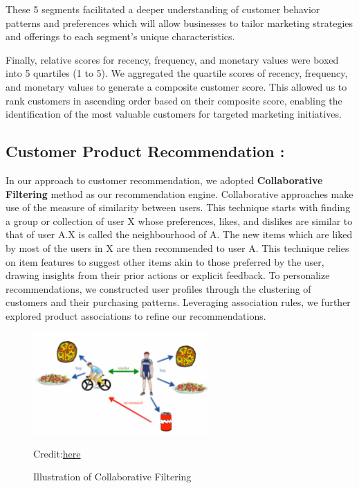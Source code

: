 \documentclass[11pt]{article} %
\begin{document}
These 5 segments facilitated a deeper understanding of customer behavior patterns and preferences which will allow businesses to tailor marketing strategies and offerings to each segment's unique characteristics. 

Finally, relative scores for recency, frequency, and monetary values were boxed into 5 quartiles (1 to 5). We aggregated the quartile scores of recency, frequency, and monetary values to generate a composite customer score. This allowed us to rank customers in ascending order based on their composite score, enabling the identification of the most valuable customers for targeted marketing initiatives.

\subsection*{Customer Product Recommendation :}
In our approach to customer recommendation, we adopted \textbf{Collaborative Filtering} method as our recommendation engine. Collaborative approaches make use of the measure of similarity between users. This technique starts with finding a group or collection of user X whose preferences, likes, and dislikes are similar to that of user A.X is called the neighbourhood of A. The new items which are liked by most of the users in X are then recommended to user A\cite{11}. This technique relies on item features to suggest other items akin to those preferred by the user, drawing insights from their prior actions or explicit feedback. To personalize recommendations, we constructed user profiles through the clustering of customers and their purchasing patterns. Leveraging association rules, we further explored product associations to refine our recommendations. 
\begin{figure}[H]
    \centering
    \includegraphics[width=0.6\textwidth]{images/collaborative_filtering.PNG}
    \caption{Illustration of Collaborative Filtering}Credit:\href{https://towardsdatascience.com/various-implementations-of-collaborative-filtering-100385c6dfe0}{here}
    \label{fig:collaborative_filtering}
\end{figure}
\end{document}
